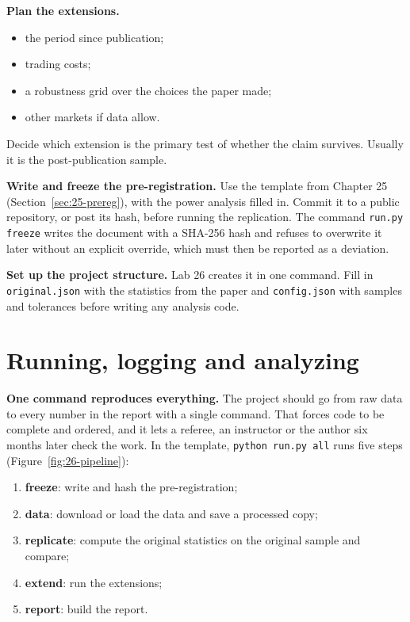 \textbf{Plan the extensions.}

\begin{itemize}
  \item the period since publication;
  \item trading costs;
  \item a robustness grid over the choices the paper made;
  \item other markets if data allow.
\end{itemize}

Decide which extension is the primary test of whether the claim survives. Usually it is the post-publication sample.

\textbf{Write and freeze the pre-registration.} Use the template from Chapter 25 (Section~\ref{sec:25-prereg}), with the power analysis filled in. Commit it to a public repository, or post its hash, before running the replication. The command \texttt{run.py freeze} writes the document with a SHA-256 hash and refuses to overwrite it later without an explicit override, which must then be reported as a deviation.

{\sloppy \textbf{Set up the project structure.} Lab 26 creates it in one command. Fill in \texttt{original.json} with the statistics from the paper and \texttt{config.json} with samples and tolerances before writing any analysis code.\par}

\section{Running, logging and analyzing}
\label{sec:26-running}

\textbf{One command reproduces everything.} The project should go from raw data to every number in the report with a single command. That forces code to be complete and ordered, and it lets a referee, an instructor or the author six months later check the work. In the template, \texttt{python run.py all} runs five steps (Figure~\ref{fig:26-pipeline}):

\begin{enumerate}
  \item \textbf{freeze}: write and hash the pre-registration;
  \item \textbf{data}: download or load the data and save a processed copy;
  \item \textbf{replicate}: compute the original statistics on the original sample and compare;
  \item \textbf{extend}: run the extensions;
  \item \textbf{report}: build the report.
\end{enumerate}

